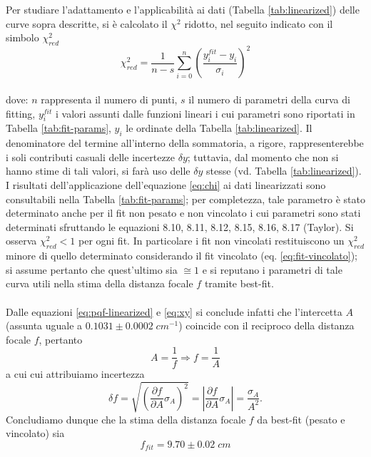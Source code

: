 \documentclass[11pt,a4paper]{article}
\begin{document}
Per studiare l'adattamento e l'applicabilità ai dati (Tabella \ref{tab:linearized}) delle curve sopra descritte, si è calcolato il $\chi^2$ ridotto, nel seguito indicato con il simbolo $\chi_{red}^2$
\\
\begin{equation}
    \chi_{red}^2 = \frac{1}{n-s} \sum_{i=0}^n \left( \frac{y_i^{fit}-y_i}{\sigma_i} \right)^2
    \label{eq:chi}
\end{equation}
\\
dove: $n$ rappresenta il numero di punti, $s$ il numero di parametri della curva di fitting, $y_i^{fit}$ i valori assunti dalle funzioni lineari i cui parametri sono riportati in Tabella \ref{tab:fit-params}, $y_i$ le ordinate della Tabella \ref{tab:linearized}. Il denominatore del termine all'interno della sommatoria, a rigore, rappresenterebbe i soli contributi casuali delle incertezze $\delta y$; tuttavia, dal momento che non si hanno stime di tali valori, si farà uso delle $\delta y$ stesse (vd. Tabella \ref{tab:linearized}). I risultati dell'applicazione dell'equazione \ref{eq:chi} ai dati linearizzati sono consultabili nella Tabella \ref{tab:fit-params}; per completezza, tale parametro è stato determinato anche per il fit non pesato e non vincolato i cui parametri sono stati determinati sfruttando le equazioni 8.10, 8.11, 8.12, 8.15, 8.16, 8.17 (Taylor). Si osserva $\chi_{red}^2 < 1$ per ogni fit. In particolare i fit non vincolati restituiscono un $\chi_{red}^2$ minore di quello determinato considerando il fit vincolato (eq. \ref{eq:fit-vincolato}); si assume pertanto che quest'ultimo sia $\cong 1$ e si reputano i parametri di tale curva utili nella stima della distanza focale $f$ tramite best-fit.
\\ \\
Dalle equazioni \ref{eq:pqf-linearized} e \ref{eq:xy} si conclude infatti che l'intercetta $A$ (assunta uguale a $0.1031 \pm 0.0002 \; cm^{-1}$) coincide con il reciproco della distanza focale $f$, pertanto
\begin{equation}
    A = \frac{1}{f} \Longrightarrow f = \frac{1}{A}
    \label{eq:f-da-A}
\end{equation}
a cui cui attribuiamo incertezza
\begin{equation}
    \delta f = \sqrt{\left ( \frac{\partial f}{\partial A}\sigma_A \right ) ^2} = \left | \frac{\partial f}{\partial A}\sigma_A \right | = \frac{\sigma_A}{A^2}.
\end{equation}
Concludiamo dunque che la stima della distanza focale $f$ da best-fit (pesato e vincolato) sia
\begin{equation}
    f_{fit} = 9.70 \pm 0.02 \; cm
    \label{eq:f-fit-value}
\end{equation}
\end{document}
